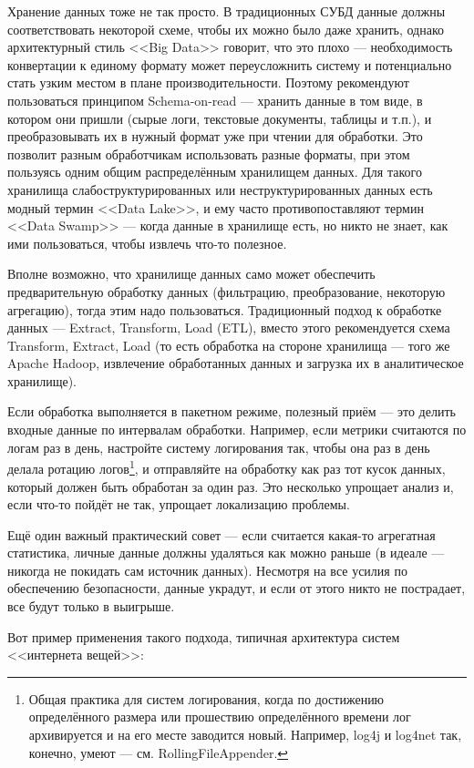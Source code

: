 \documentclass[a5paper]{article}
\begin{document}
Хранение данных тоже не так просто. В традиционных СУБД данные должны соответствовать некоторой схеме, чтобы их можно было даже хранить, однако архитектурный стиль <<Big Data>> говорит, что это плохо --- необходимость конвертации к единому формату может переусложнить систему и потенциально стать узким местом в плане производительности. Поэтому рекомендуют пользоваться принципом Schema-on-read --- хранить данные в том виде, в котором они пришли (сырые логи, текстовые документы, таблицы и т.п.), и преобразовывать их в нужный формат уже при чтении для обработки. Это позволит разным обработчикам использовать разные форматы, при этом пользуясь одним общим распределённым хранилищем данных. Для такого хранилища слабоструктурированных или неструктурированных данных есть модный термин <<Data Lake>>, и ему часто противопоставляют термин <<Data Swamp>> --- когда данные в хранилище есть, но никто не знает, как ими пользоваться, чтобы извлечь что-то полезное.

Вполне возможно, что хранилище данных само может обеспечить предварительную обработку данных (фильтрацию, преобразование, некоторую агрегацию), тогда этим надо пользоваться. Традиционный подход к обработке данных --- Extract, Transform, Load (ETL), вместо этого рекомендуется схема Transform, Extract, Load (то есть обработка на стороне хранилища --- того же Apache Hadoop, извлечение обработанных данных и загрузка их в аналитическое хранилище).

Если обработка выполняется в пакетном режиме, полезный приём --- это делить входные данные по интервалам обработки. Например, если метрики считаются по логам раз в день, настройте систему логирования так, чтобы она раз в день делала ротацию логов\footnote{Общая практика для систем логирования, когда по достижению определённого размера или прошествию определённого времени лог архивируется и на его месте заводится новый. Например, log4j и log4net так, конечно, умеют --- см. RollingFileAppender.}, и отправляйте на обработку как раз тот кусок данных, который должен быть обработан за один раз. Это несколько упрощает анализ и, если что-то пойдёт не так, упрощает локализацию проблемы.

Ещё один важный практический совет --- если считается какая-то агрегатная статистика, личные данные должны удаляться как можно раньше (в идеале --- никогда не покидать сам источник данных). Несмотря на все усилия по обеспечению безопасности, данные украдут, и если от этого никто не пострадает, все будут только в выигрыше.

Вот пример применения такого подхода, типичная архитектура систем <<интернета вещей>>:
\end{document}
